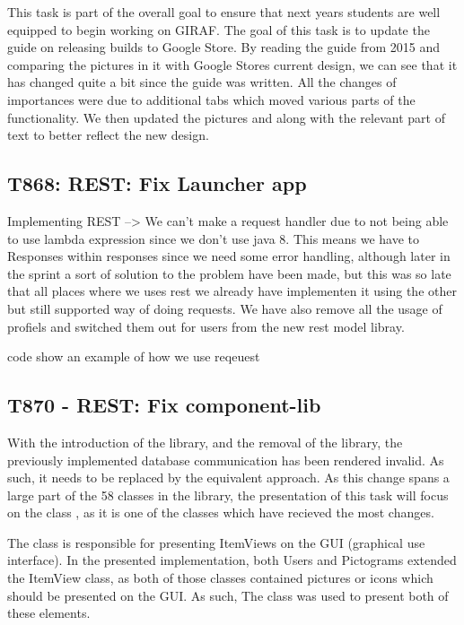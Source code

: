 This task is part of the overall goal to ensure that next years students are
well equipped to begin working on GIRAF. The goal of this task is to update the
guide on releasing builds to Google Store. By reading the guide from 2015 and
comparing the pictures in it with Google Stores current design, we can see that
it has changed quite a bit since the guide was written. All the changes of
importances were due to additional tabs which moved various parts of the
functionality. We then updated the pictures and along with the relevant part of
text to better reflect the new design.


\subsection{T868: REST: Fix Launcher app}
Implementing REST --> We can't make a request handler due to not being able
to use lambda expression since we don't use java 8.
This means we have to Responses within responses since we need some error
handling, although later in the sprint a sort of solution to the problem have
been made, but this was so late that all places where we uses rest we already
have implementen it using the other but still supported way of doing requests.
We have also remove all the usage of profiels and switched them out for users
from the new rest model libray.

code show an example of how we use reqeuest

\subsection{T870 - REST: Fix component-lib}
With the introduction of the  library, and the removal of the
 library, the previously implemented database communication has
been rendered invalid. As such, it needs to be replaced by the equivalent
 approach. As this change spans a large part of the 58
classes in the  library, the presentation of this task will
focus on the class , as it is one of the
classes which have recieved the most changes.\nl

The  class is responsible for presenting ItemViews
on the GUI (graphical use interface). In the presented implementation, both
Users and Pictograms extended the ItemView class, as both of those classes
contained pictures or icons which should be presented on the GUI. As such, The
 class was used to present both of these
elements.\nl

